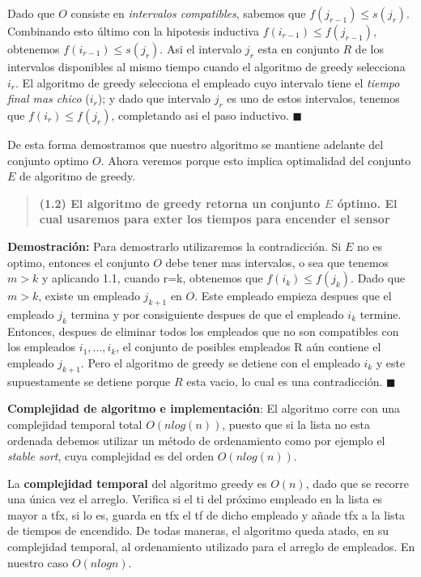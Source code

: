 \documentclass{article}
\begin{document}
Dado que \(O\) consiste en \textit{intervalos compatibles}, sabemos que \(f(j_{r-1}) \leq s(j_r)\). Combinando esto último con la hipotesis inductiva \(f(i_{r-1}) \leq f(j_{r-1})\), obtenemos \(f(i_{r-1}) \leq s(j_{r})\). 
Asi el intervalo \(j_r\) esta en conjunto \(R\) de los intervalos disponibles al mismo tiempo cuando el algoritmo de greedy selecciona \(i_r\).
El algoritmo de greedy selecciona el empleado cuyo intervalo tiene el \textit{tiempo final mas chico} (\(i_{r}\)); y dado que intervalo \(j_{r}\) es uno de estos intervalos, tenemos que \(f(i_r) \leq f(j_r)\), completando asi el paso inductivo. \(\blacksquare\)

De esta forma demostramos que nuestro algoritmo se mantiene adelante del conjunto optimo \(O\). Ahora veremos porque esto implica optimalidad del conjunto \(E\) de algoritmo de greedy.

\begin{quote}
    \textbf{(1.2) El algoritmo de greedy retorna un conjunto \(E\) óptimo. El cual usaremos para exter los tiempos para encender el sensor}
\end{quote}

\textbf{Demostración:} Para demostrarlo utilizaremos la contradicción. Si \(E\) no es optimo, entonces el conjunto \(O\) debe tener mas intervalos, o sea que tenemos \(m>k\) y aplicando 1.1, cuando r=k, 
obtenemos que \(f(i_k) \leq f(j_k)\). Dado que \(m>k\), existe un empleado \(j_{k+1}\) en \(O\). Este empleado empieza despues que el empleado \(j_k\) termina y por consiguiente despues de que el empleado \(i_k\) termine.
Entonces, despues de eliminar todos los empleados que no son compatibles con los empleados \(i_1,...,i_k\), el conjunto de posibles empleados R aún contiene el empleado \(j_{k+1}\). 
Pero el algoritmo de greedy se detiene con el empleado \(i_k\) y este supuestamente se detiene porque \(R\) esta vacio, lo cual es una contradicción. \(\blacksquare\)

\textbf{Complejidad de algoritmo e implementación}: 
El algoritmo corre con una complejidad temporal total \(O(nlog(n))\), puesto que si la lista no esta ordenada 
debemos utilizar un método de ordenamiento como por ejemplo el \textit{stable sort}, cuya complejidad es del 
orden \(O(n log(n))\). 

La \textbf{complejidad temporal} del algoritmo greedy es \(O(n)\), dado que se recorre una única vez el arreglo. 
Verifica si el ti del próximo empleado en la lista es mayor a tfx, si lo es, guarda en tfx el 
tf de dicho empleado y añade tfx a la lista de tiempos de encendido. De todas maneras, 
el algoritmo queda atado, en su complejidad temporal, al ordenamiento utilizado para el 
arreglo de empleados. En nuestro caso \(O(nlogn)\).
\end{document}
